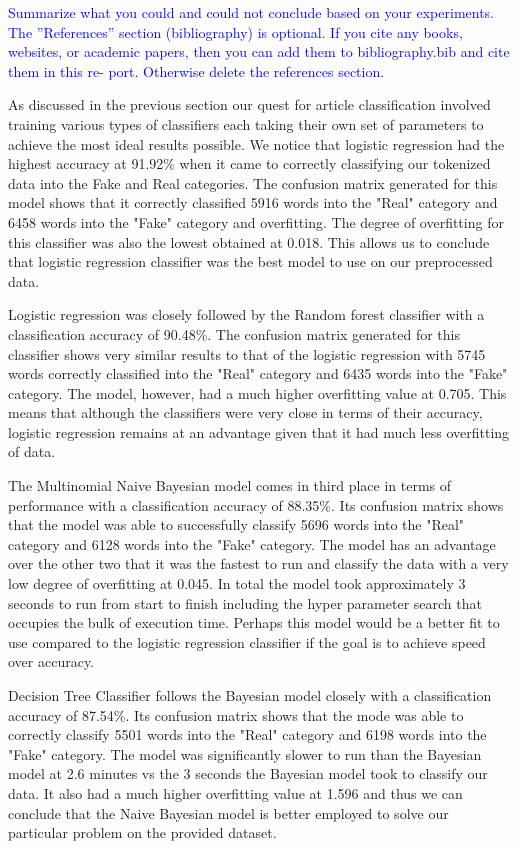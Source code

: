 \documentclass[10pt,twocolumn,letterpaper]{article}
\begin{document}
\textcolor{blue}{Summarize what you could and could not conclude based on your experiments.
The ”References” section (bibliography) is optional. If you cite any books, websites, or academic papers, then you can add them to bibliography.bib and cite them in this re- port. Otherwise delete the references section.}

As discussed in the previous section our quest for article classification involved training various types of classifiers each taking their own set of parameters to achieve the most ideal results possible. We notice that logistic regression had the highest accuracy at 91.92\% when it came to correctly classifying our tokenized data into the Fake and Real categories. The confusion matrix generated for this model shows that it correctly classified 5916 words into the "Real" category and 6458 words into the "Fake" category and overfitting. The degree of overfitting for this classifier was also the lowest obtained at 0.018. This allows us to conclude that logistic regression classifier was the best model to use on our preprocessed data. 

Logistic regression was closely followed by the Random forest classifier with a classification accuracy of 90.48\%. The confusion matrix generated for this classifier shows very similar results to that of the logistic regression with 5745 words correctly classified into the "Real" category and 6435 words into the "Fake" category. The model, however, had a much higher overfitting value at 0.705. This means that although the classifiers were very close in terms of their accuracy, logistic regression remains at an advantage given that it had much less overfitting of data. 

The Multinomial Naive Bayesian model comes in third place in terms of performance with a classification accuracy of 88.35\%. Its confusion matrix shows that the model was able to successfully classify 5696 words into the "Real" category and 6128 words into the "Fake" category. The model has an advantage over the other two that it was the fastest to run and classify the data with a very low degree of overfitting at 0.045. In total the model took approximately 3 seconds to run from start to finish including the hyper parameter search that occupies the bulk of execution time. Perhaps this model would be a better fit to use compared to the logistic regression classifier if the goal is to achieve speed over accuracy. 

Decision Tree Classifier follows the Bayesian model closely with a classification accuracy of 87.54\%. Its confusion matrix shows that the mode was able to correctly classify 5501 words into the "Real" category and 6198 words into the "Fake" category. The model was significantly slower to run than the Bayesian model at 2.6 minutes vs the 3 seconds the Bayesian model took to classify our data. It also had a much higher overfitting value at 1.596 and thus we can conclude that the Naive Bayesian model is better employed to solve our particular problem on the provided dataset.  
\end{document}
